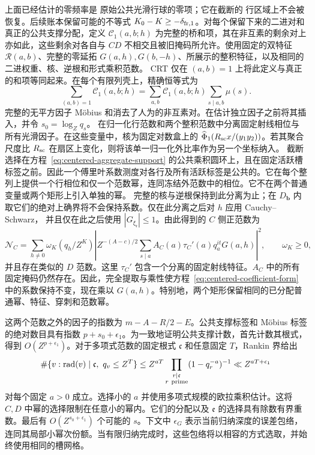 \documentclass[11pt,a4paper]{article}
\numberwithin{equation}{section}
\numberwithin{figure}{section}
\theoremstyle{definition}
\theoremstyle{remark}
\begin{document}
上面已经估计的零频率是
原始公共光滑行球的零项；它在截断的
行区域上不会被恢复。后续账本保留可能的不等式
\(K_0-K\ge-\delta_{{\rm fr},1}\)。对每个保留下来的二进对和真正的公共支撑分配，定义
\(\mathcal C_1(a,b;h)\) 为完整的桥和项，其在非互素的剩余对上亦如此，这些剩余对各自与 \(CD\) 不相交且被旧掩码所允许。使用固定的双特征 \(\mathcal R(a,b)\)、完整的零延拓 \(G(a,h),G(b,-h)\)、所展示的整积特征，以及相同的二进权重、核、逆根和形式乘积范数。
CRT 仅在 \((a,b)=1\) 上将此定义与真正的和项等同起来。在每个有限列壳上，精确恒等式为
\[
 \sum_{(a,b)=1}\mathcal C_1(a,b;h)
 =\sum_{a,b}\mathcal C_1(a,b;h)\sum_{s\mid a,b}\mu(s).
\]
完整的无平方因子 M\"obius 和消去了人为的非互素对。在估计独立因子之前将其插入，并令
\(s_0=\log_Zq_s\)。
在归一化行范数和两个整积范数中分离固定射线相位与所有光滑因子。在这些变量中，核为固定对数盒上的 \(\widehat\Phi_1(R_{\rm sc}x/(y_1y_2))\)。若其聚合尺度比 \(R_{\rm sc}\) 在扇区上变化，则将该单一归一化外比率作为另一个坐标纳入。
截断选择在方程~\eqref{eq:centered-aggregate-support} 的公共乘积圆环上，且在固定活跃槽标签之前。因此一个傅里叶系数测度对各行及所有活跃标签是公共的。它在每个整列上提供一个行相位和仅一个范数幂，连同冻结外范数中的相位。它不在两个普通变量或两个矩形上引入单独的幂。
完整的核与逆根保持到此分离为止；在 \(D_{\mathbf b}\) 内取它们的绝对上确界将不会保持系数。仅在此分离之后对 \(h\) 应用 Cauchy--Schwarz，
并且仅在此之后使用 \(|G_{\xi_{\mathfrak r}}|\le1\)。由此得到的 \(C\) 侧正范数为
\[
 \mathcal N_C=
 \sum_{h\ne0}\omega_K(q_h/Z^K)
 \left|Z^{-(A-c)/2}
   \sum_{s\mid a}A_C(a)\tau_C'(a)q_a^{it}G(a,h)\right|^2,
 \qquad \omega_K\ge0,
\]
并且存在类似的 \(D\) 范数。这里 \(\tau_C'\) 包含一个分离的固定射线特征。\(A_C\) 中的所有固定掩码仍然存在。因此，完全提取与乘性使方程~\eqref{eq:centered-coefficient-form} 中的系数保持不变，现在乘以 \(G(a,h)\)。特别地，两个矩形保留相同的已分配普通幂、特征、穿刺和范数幂。

这两个范数之外的因子的指数为
\(m-A-R/2-E\)。公共支撑标签和 M\"obius 标签的绝对数目具有指数 \(p+s_0+\epsilon_1\)。为一致地证明公共支撑计数，首先计数其根式，得到
\(O(Z^{p+\epsilon_1})\)。对于多项式范数的固定根式 \(\mathfrak c\) 和任意固定 \(T\)，Rankin 界给出
\[
 \#\{v:\operatorname{rad}(v)\mid\mathfrak c,\ q_v\le Z^T\}
 \le Z^{aT}\prod_{\substack{r\mid\mathfrak c\\r\ {\rm prime}}}
             (1-q_r^{-a})^{-1}
 \ll Z^{aT+\epsilon_1}
\]
对每个固定 \(a>0\) 成立。选择小的 \(a\) 并使用多项式规模的欧拉乘积估计。这将 \(C,D\) 中幂的选择限制在任意小的幂内。它们的分配以及 \(\mathfrak e\) 的选择具有除数有界重数。最后有 \(O(Z^{s_0+\epsilon_1})\)
个可能的 \(s\)。下文中 \(\epsilon_G\) 表示当前归纳深度的误差包络，连同其局部小幂次份额。当有限归纳完成时，这些包络将以相容的方式选取，并始终使用相同的槽网格。
\end{document}
